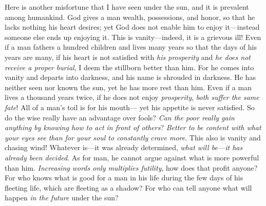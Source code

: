 \begin{biblechapter} %
 Here is another misfortune that I have seen under the sun, and it is prevalent among humankind.
\verse God gives a man wealth, possessions, and honor, so that he lacks nothing his heart desires; yet God does not enable him to enjoy it—instead someone else ends up enjoying it. This is vanity—indeed, it is a grievous ill!
\verse Even if a man fathers a hundred children and lives many years so that the days of his years are many, if his heart is not satisfied with \textit{his prosperity} and \textit{he does not receive a proper burial}, I deem the stillborn better than him.
\verse For he comes into vanity and departs into darkness, and his name is shrouded in darkness.
\verse He has neither seen nor known the sun, yet he has more rest than him.
\verse Even if a man lives a thousand years twice, if he does not enjoy \textit{prosperity}, \textit{both suffer the same fate}!
 All of a man’s toil is for his mouth— 
yet his appetite is never satisfied.
\verse So do the wise really have an advantage over fools? 
\textit{Can the poor really gain anything by knowing how to act in front of others}?
\verse \textit{Better to be content with what your eyes see 
than for your soul to constantly crave more}. 
This also is vanity and chasing wind!
 Whatever is—it was already determined, 
\textit{what will be—it has already been decided}. 
As for man, he cannot argue 
against what is more powerful than him.
\verse \textit{Increasing words only multiplies futility}, 
how does that profit anyone?
 For who knows what is good for a man in his life during the few days of his fleeting life, which are fleeting as a shadow? For who can tell anyone what will happen \textit{in the future} under the sun?
\end{biblechapter}

